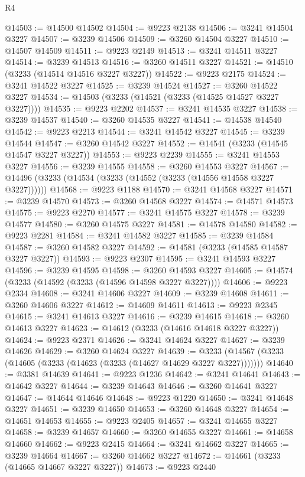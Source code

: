 \begin{lexlean}{R4}
\begin{coremodule}
@14503 := @14500 @14502
@14504 := @9223 @2138
@14506 := @3241 @14504 @3227
@14507 := @3239 @14506
@14509 := @3260 @14504 @3227
@14510 := @14507 @14509
@14511 := @9223 @2149
@14513 := @3241 @14511 @3227
@14514 := @3239 @14513
@14516 := @3260 @14511 @3227
@14521 := @14510 (@3233 (@14514 @14516 @3227 @3227))
@14522 := @9223 @2175
@14524 := @3241 @14522 @3227
@14525 := @3239 @14524
@14527 := @3260 @14522 @3227
@14534 := @14503 (@3233 (@14521 (@3233 (@14525 @14527 @3227 @3227))))
@14535 := @9223 @2202
@14537 := @3241 @14535 @3227
@14538 := @3239 @14537
@14540 := @3260 @14535 @3227
@14541 := @14538 @14540
@14542 := @9223 @2213
@14544 := @3241 @14542 @3227
@14545 := @3239 @14544
@14547 := @3260 @14542 @3227
@14552 := @14541 (@3233 (@14545 @14547 @3227 @3227))
@14553 := @9223 @2239
@14555 := @3241 @14553 @3227
@14556 := @3239 @14555
@14558 := @3260 @14553 @3227
@14567 := @14496 (@3233 (@14534 (@3233 (@14552 (@3233 (@14556 @14558 @3227 @3227))))))
@14568 := @9223 @1188
@14570 := @3241 @14568 @3227
@14571 := @3239 @14570
@14573 := @3260 @14568 @3227
@14574 := @14571 @14573
@14575 := @9223 @2270
@14577 := @3241 @14575 @3227
@14578 := @3239 @14577
@14580 := @3260 @14575 @3227
@14581 := @14578 @14580
@14582 := @9223 @2281
@14584 := @3241 @14582 @3227
@14585 := @3239 @14584
@14587 := @3260 @14582 @3227
@14592 := @14581 (@3233 (@14585 @14587 @3227 @3227))
@14593 := @9223 @2307
@14595 := @3241 @14593 @3227
@14596 := @3239 @14595
@14598 := @3260 @14593 @3227
@14605 := @14574 (@3233 (@14592 (@3233 (@14596 @14598 @3227 @3227))))
@14606 := @9223 @2334
@14608 := @3241 @14606 @3227
@14609 := @3239 @14608
@14611 := @3260 @14606 @3227
@14612 := @14609 @14611
@14613 := @9223 @2345
@14615 := @3241 @14613 @3227
@14616 := @3239 @14615
@14618 := @3260 @14613 @3227
@14623 := @14612 (@3233 (@14616 @14618 @3227 @3227))
@14624 := @9223 @2371
@14626 := @3241 @14624 @3227
@14627 := @3239 @14626
@14629 := @3260 @14624 @3227
@14639 := @3233 (@14567 (@3233 (@14605 (@3233 (@14623 (@3233 (@14627 @14629 @3227 @3227)))))))
@14640 := @3381 @14639
@14641 := @9223 @1236
@14642 := @3241 @14641
@14643 := @14642 @3227
@14644 := @3239 @14643
@14646 := @3260 @14641 @3227
@14647 := @14644 @14646
@14648 := @9223 @1220
@14650 := @3241 @14648 @3227
@14651 := @3239 @14650
@14653 := @3260 @14648 @3227
@14654 := @14651 @14653
@14655 := @9223 @2405
@14657 := @3241 @14655 @3227
@14658 := @3239 @14657
@14660 := @3260 @14655 @3227
@14661 := @14658 @14660
@14662 := @9223 @2415
@14664 := @3241 @14662 @3227
@14665 := @3239 @14664
@14667 := @3260 @14662 @3227
@14672 := @14661 (@3233 (@14665 @14667 @3227 @3227))
@14673 := @9223 @2440

\end{coremodule}
\end{lexlean}
